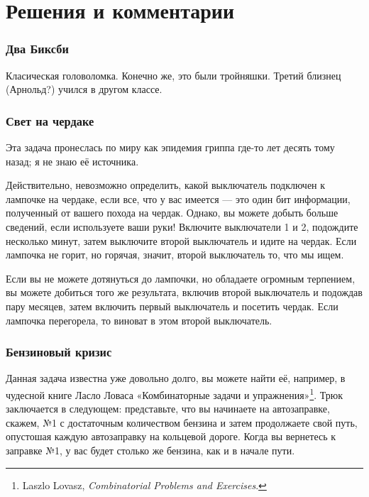 \section*{Решения и комментарии}


\subsubsection*{Два Биксби} %



Класическая головоломка. 
Конечно же, это  были тройняшки. 
Третий близнец (Арнольд?) учился в другом классе.




\subsubsection*{Свет на чердаке}  %



Эта задача пронеслась по миру как эпидемия гриппа где-то лет десять тому назад; я не знаю её источника.


Действительно, невозможно определить, какой выключатель подключен к лампочке на чердаке, если все, что у вас имеется --- это один бит информации, полученный от вашего похода на чердак. Однако, вы можете добыть больше сведений, если используете ваши руки!  Включите выключатели 1 и 2, подождите несколько минут, затем выключите второй выключатель и идите на чердак. Если лампочка не горит, но горячая, значит, второй выключатель то, что мы ищем.\heart


Если вы не можете дотянуться до лампочки, но обладаете огромным терпением, вы можете добиться того же результата, включив второй выключатель и подождав пару месяцев, затем включить первый выключатель и посетить чердак. 
Если лампочка перегорела, то виноват в этом второй выключатель.


\subsubsection*{Бензиновый кризис} %

Данная задача известна уже довольно долго, вы можете найти её, например, в чудесной книге  Ласло Ловаса  «Комбинаторные задачи и упражнения»\footnote{Laszlo Lovasz, \emph{Combinatorial Problems and Exercises}.}. Трюк заключается в следующем:
представьте, что вы начинаете на автозаправке, скажем, №1 с достаточным количеством бензина и затем продолжаете свой путь, опустошая каждую автозаправку на кольцевой дороге. 
Когда вы вернетесь к заправке №1, 
у вас будет столько же бензина, как и в начале пути.

